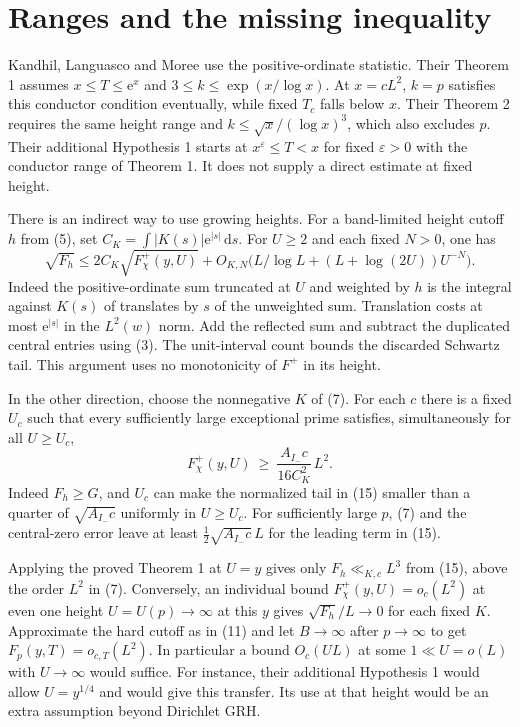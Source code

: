 \documentclass[11pt]{article}
\newcommand{\e}{\mathrm e}
\newcommand{\wt}{\mathrm d}
\begin{document}
\section{Ranges and the missing inequality}
Kandhil, Languasco and Moree \cite{klm} use the positive-ordinate
statistic. Their Theorem 1 assumes $x\le T\le\e^x$ and
$3\le k\le\exp(x/\log x)$. At $x=cL^2$, $k=p$ satisfies this
conductor condition eventually, while fixed $T_c$ falls below $x$.
Their Theorem 2 requires the same height range and
$k\le\sqrt x/(\log x)^3$, which also excludes $p$. Their additional
Hypothesis 1 starts at $x^\varepsilon\le T<x$ for fixed
$\varepsilon>0$ with the conductor range of Theorem 1. It does not
supply a direct estimate at fixed height.

There is an indirect way to use growing heights. For a band-limited
height cutoff $h$ from (5), set $C_K=\int|K(s)|\e^{|s|}\,\wt s$. For
$U\ge2$ and each fixed $N>0$, one has
\[
 \sqrt{F_h}\le 2C_K\sqrt{F^+_\chi(y,U)}
 +O_{K,N}\big(L/\log L+(L+\log(2U))U^{-N}\big).
 \tag{15}
\]
Indeed the positive-ordinate sum truncated at $U$ and weighted by $h$
is the integral against $K(s)$ of translates by $s$ of the unweighted
sum. Translation costs at most $\e^{|s|}$ in the $L^2(w)$ norm.
Add the reflected sum and subtract the duplicated central entries
using (3). The unit-interval count bounds the discarded Schwartz tail.
This argument uses no monotonicity of $F^+$ in its height.

In the other direction, choose the nonnegative $K$ of (7). For each
$c$ there is a fixed $U_c$ such that every sufficiently large
exceptional prime satisfies, simultaneously for all $U\ge U_c$,
\[
  F^+_\chi(y,U)\ \ge\ \frac{A_{I_-}c}{16C_K^2}\,L^2 .
  \tag{16}
\]
Indeed $F_h\ge G$, and $U_c$ can make the normalized tail in (15)
smaller than a quarter of $\sqrt{A_{I_-}c}$ uniformly in $U\ge U_c$.
For sufficiently large $p$, (7) and the central-zero error leave
at least $\tfrac12\sqrt{A_{I_-}c}\,L$ for the leading term in (15).

Applying the proved Theorem 1 at $U=y$ gives only $F_h\ll_{K,c}L^3$
from (15), above the order $L^2$ in (7). Conversely, an individual
bound $F^+_\chi(y,U)=o_c(L^2)$ at even one height $U=U(p)\to\infty$
at this $y$ gives $\sqrt{F_h}/L\to0$ for each fixed $K$. Approximate the
hard cutoff as in (11) and let $B\to\infty$ after $p\to\infty$ to get
$F_p(y,T)=o_{c,T}(L^2)$. In particular a bound $O_c(UL)$ at some
$1\ll U=o(L)$ with $U\to\infty$ would suffice. For instance, their
additional Hypothesis 1 would allow $U=y^{1/4}$ and would give this
transfer. Its use at that height would be an extra assumption beyond
Dirichlet GRH.
\end{document}
